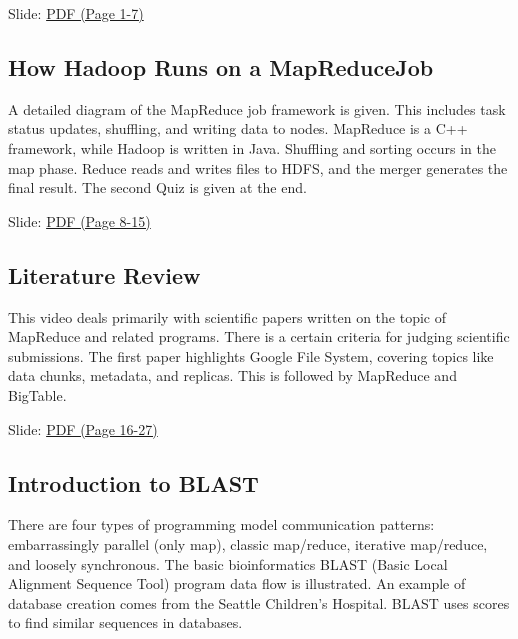 
  Slide:
  \href{https://drive.google.com/open?id=0B88HKpainTSfd3hkTG4yY2FYUVE}{PDF
  (Page 1-7)}

\subsection{How Hadoop Runs on a MapReduceJob}

A detailed diagram of the MapReduce job framework is given. This
includes task status updates, shuffling, and writing data to nodes.
MapReduce is a C++ framework, while Hadoop is written in Java. Shuffling
and sorting occurs in the map phase. Reduce reads and writes files to
HDFS, and the merger generates the final result. The second Quiz is
given at the end.


  Slide:
  \href{https://drive.google.com/open?id=0B88HKpainTSfd3hkTG4yY2FYUVE}{PDF
  (Page 8-15)}

\subsection{Literature Review}

This video deals primarily with scientific papers written on the topic
of MapReduce and related programs. There is a certain criteria for
judging scientific submissions. The first paper highlights Google File
System, covering topics like data chunks, metadata, and replicas. This
is followed by MapReduce and BigTable.


  Slide:
  \href{https://drive.google.com/open?id=0B88HKpainTSfd3hkTG4yY2FYUVE}{PDF
  (Page 16-27)}

\subsection{Introduction to BLAST}

There are four types of programming model communication patterns:
embarrassingly parallel (only map), classic map/reduce, iterative
map/reduce, and loosely synchronous. The basic bioinformatics BLAST
(Basic Local Alignment Sequence Tool) program data flow is illustrated.
An example of database creation comes from the Seattle Children's
Hospital. BLAST uses scores to find similar sequences in databases.

